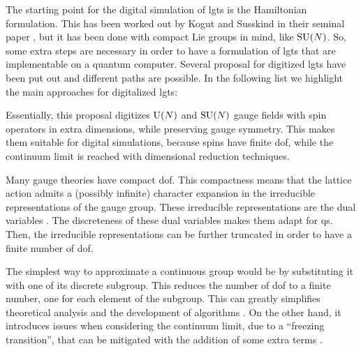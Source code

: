 The starting point for the digital simulation of \acp{lgt} is the Hamiltonian formulation.
This has been worked out by Kogut and Susskind in their seminal paper \cite{kogut1975hamiltonian}, but it has been done with compact Lie groups in mind, like $\text{SU}(N)$.
So, some extra steps are necessary in order to have a formulation of \acp{lgt} that are implementable on a quantum computer.
Several proposal for digitized \acp{lgt} have been put out
\cite{zohar2015latticegauge, zohar2017digital, zohar2017z2gauge, milstead2018qyangmills, bender2018lgt3d, cui2020circuit, byrnes2006lgt, chandrasekharan1997linkmodels, hackett2019lgt, lamm2019lgt}
and different paths are possible.
In the following list we highlight the main approaches for digitalized \acp{lgt}:
\begin{description}[labelsep=1.1em]
    \item[Quantum Link Models]
        Essentially, this proposal \cite{chandrasekharan1997linkmodels, brower1999linkmodel} digitizes $\mathrm{U}(N)$ and $\text{SU}(N)$ gauge fields with spin operators in extra dimensions, while preserving gauge symmetry.
        This makes them suitable for digital simulations, because spins have finite \ac{dof}, while the continuum limit is reached with dimensional reduction techniques.

    \item[Dual variables]
        Many gauge theories have compact \ac{dof}.
        This compactness means that the lattice action admits a (possibly infinite) character expansion in the irreducible representations of the gauge group.
        These irreducible representations are the dual variables \cite{savit1980duality, kaplan2020lgt}.
        The discreteness of these dual variables makes them adapt for \ac{qs}.
        Then, the irreducible representations can be further truncated in order to have a finite number of \ac{dof}.

    \item[Finite subgroups]
        The simplest way to approximate a continuous group would be by substituting it with one of its discrete subgroup.
        This reduces the number of \ac{dof} to a finite number, one for each element of the subgroup.
        This can greatly simplifies theoretical analysis \cite{fradkin1979phase} and the development of algorithms \cite{lamm2019lgt}.
        On the other hand, it introduces issues when considering the continuum limit, due to a ``freezing transition'', that can be mitigated with the addition of some extra terms \cite{ji2020digitization, lamm2019gluon}.

\end{description}

